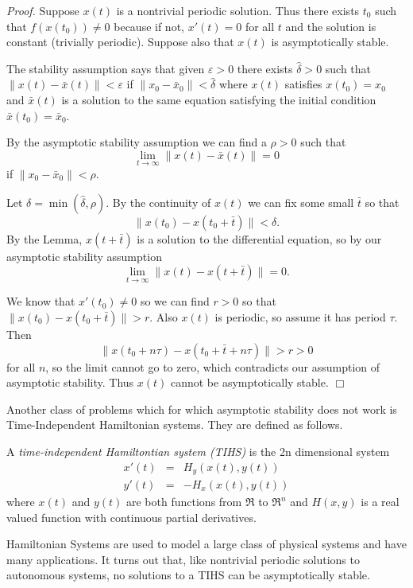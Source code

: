 \documentclass[12pt]{article}
\def\e{there exists }
\def\pf{{\em Proof. }}
\def\eps{\varepsilon}
\def\bx{\bar{x}}
\begin{document}
\pf Suppose $x(t)$ is a nontrivial periodic solution.  Thus \e $t_0$
such that $f(x(t_0)) \neq 0$ because if not, $x'(t) = 0$ for all $t$
and the solution is constant (trivially periodic).  Suppose also that
$x(t)$ is asymptotically stable.

The stability assumption says that given $\eps > 0$ \e $\hat{\delta}
> 0$ such that $\| x(t) - \bx(t) \| < \eps$ if $ \| x_0 - \bx_0 \| <
\hat{\delta}$ where $x(t)$ satisfies $x(t_0) = x_0$ and $\bx(t)$ is a
solution to the same equation satisfying the initial condition
$\bx(t_0) = \bx_0$.

By the asymptotic stability assumption we can find a $\rho > 0$ such
that 
$$\lim_{t \rightarrow \infty} \| x(t) - \bx(t) \| = 0$$
if $\| x_0 - \bx_0 \| < \rho$.

Let $\delta = \min (\hat{\delta}, \rho)$.  By the continuity of $x(t)$
we can fix some small $\bar{t}$ so that 
$$\| x(t_0) - x(t_0 + \bar{t}) \| < \delta.$$
By the Lemma, $x(t + \bar{t})$ is a solution to the differential
equation, so by our asymptotic stability assumption
$$\lim_{t \rightarrow \infty} \| x(t) - x(t + \bar{t})\|  = 0.$$

We know that $x'(t_0) \neq 0$ so we can find $r > 0$ so that $\|x(t_0)
- x(t_0 + \bar{t}) \| > r$.  Also $x(t)$ is periodic, so assume it has
period $\tau$.  Then
$$\| x(t_0 + n \tau) - x(t_0 + \bar{t} + n \tau) \| > r >0$$
for all $n$, so the limit cannot go to zero, which contradicts our
assumption of asymptotic stability.  Thus $x(t)$ cannot be
asymptotically stable. $\Box$ 

Another class of problems which for which asymptotic stability does
not work is Time-Independent Hamiltonian systems.  They are defined as follows.

\begin{dfn}
	A {\em time-independent Hamiltontian system (TIHS)} is the 2n
dimensional system
\begin{eqnarray*}
	x'(t) & = & H_y(x(t), y(t)) \\
	y'(t) & = & -H_x(x(t), y(t))
\end{eqnarray*}
where $x(t)$ and $y(t)$ are both functions from $\Re$ to $\Re^n$ and
$H(x,y)$ is a real valued function with continuous partial
derivatives.
\end{dfn}

Hamiltonian Systems are used to model a large class of physical systems
and have many applications.  It turns out that, like nontrivial
periodic solutions to autonomous systems, no solutions to a TIHS can be
asymptotically stable.
\end{document}
